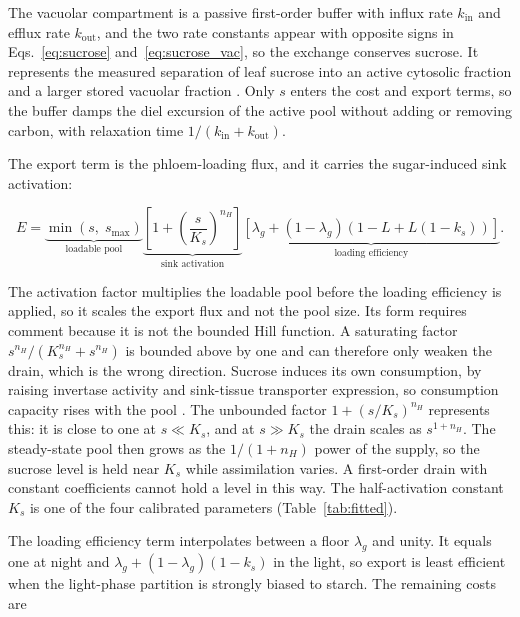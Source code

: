 The vacuolar compartment is a passive first-order buffer with influx rate
$k_{\mathrm{in}}$ and efflux rate $k_{\mathrm{out}}$, and the two rate constants
appear with opposite signs in Eqs.~\eqref{eq:sucrose} and~\eqref{eq:sucrose_vac},
so the exchange conserves sucrose. It represents the measured separation of leaf
sucrose into an active cytosolic fraction and a larger stored vacuolar fraction
\citep{Lohaus2000,Nadwodnik2008}. Only $s$ enters the cost and export terms, so
the buffer damps the diel excursion of the active pool without adding or removing
carbon, with relaxation time $1/(k_{\mathrm{in}}+k_{\mathrm{out}})$.

The export term is the phloem-loading flux, and it carries the sugar-induced
sink activation:

\begin{equation}
E =
\underbrace{\min\!\left(s,\;s_{\max}\right)}_{\text{loadable pool}}
\underbrace{\left[1 + \left(\frac{s}{K_s}\right)^{n_H}\right]}_{\text{sink activation}}
\underbrace{\left[\lambda_g + \left(1-\lambda_g\right)\left(1 - L + L\left(1-k_s\right)\right)\right]}_{\text{loading efficiency}} .
\label{eq:export}
\end{equation}

The activation factor multiplies the loadable pool before the loading efficiency
is applied, so it scales the export flux and not the pool size. Its form requires
comment because it is not the bounded Hill function. A saturating factor
$s^{n_H}/(K_s^{n_H}+s^{n_H})$ is bounded above by one and can therefore only
weaken the drain, which is the wrong direction. Sucrose induces its own
consumption, by raising invertase activity and sink-tissue transporter
expression, so consumption capacity rises with the pool
\citep{Smith2007,Stitt2012}. The unbounded factor $1+(s/K_s)^{n_H}$ represents
this: it is close to one at $s \ll K_s$, and at $s \gg K_s$ the drain scales as
$s^{1+n_H}$. The steady-state pool then grows as the $1/(1+n_H)$ power of the
supply, so the sucrose level is held near $K_s$ while assimilation varies. A
first-order drain with constant coefficients cannot hold a level in this way. The
half-activation constant $K_s$ is one of the four calibrated parameters
(Table~\ref{tab:fitted}).

The loading efficiency term interpolates between a floor $\lambda_g$ and unity.
It equals one at night and $\lambda_g + (1-\lambda_g)(1-k_s)$ in the light, so
export is least efficient when the light-phase partition is strongly biased to
starch. The remaining costs are


